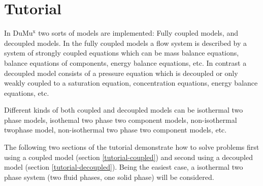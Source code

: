 \chapter[Tutorial]{Tutorial}
In DuMu$^\text{x}$ two sorts of models are implemented: Fully coupled models, and decoupled models. In the fully coupled models a flow system is described by a system of strongly coupled equations which can be mass balance equations, balance equations of components, energy balance equations, etc. In contrast a decoupled model consists of a pressure equation which is decoupled or only weakly coupled to a saturation equation, concentration equations, energy balance equations, etc.

Different kinds of both coupled and decoupled models can be isothermal two phase models, isothemal two phase two component models, non-isothermal twophase model, non-isothermal two phase two component models, etc.

The following two sections of the tutorial demonstrate how to solve problems first using a coupled model (section \ref{tutorial-coupled}) and second using a decoupled model (section \ref{tutorial-decoupled}). Being the easiest case, a isothermal two phase system (two fluid phases, one solid phase) will be considered.


